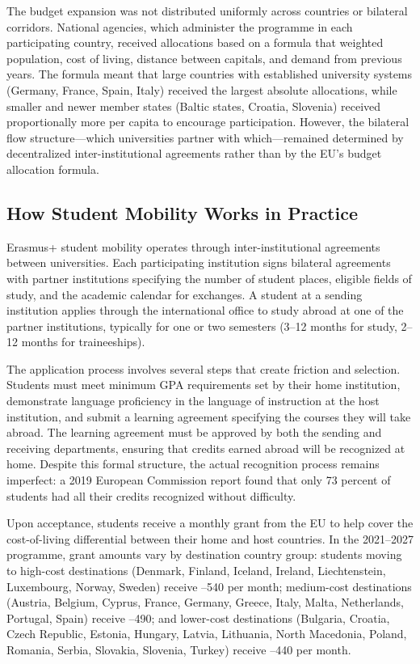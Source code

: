 \documentclass[12pt]{article}
\begin{document}
The budget expansion was not distributed uniformly across countries or bilateral corridors. National agencies, which administer the programme in each participating country, received allocations based on a formula that weighted population, cost of living, distance between capitals, and demand from previous years. The formula meant that large countries with established university systems (Germany, France, Spain, Italy) received the largest absolute allocations, while smaller and newer member states (Baltic states, Croatia, Slovenia) received proportionally more per capita to encourage participation. However, the bilateral flow structure---which universities partner with which---remained determined by decentralized inter-institutional agreements rather than by the EU's budget allocation formula.

\subsection{How Student Mobility Works in Practice}

Erasmus+ student mobility operates through inter-institutional agreements between universities. Each participating institution signs bilateral agreements with partner institutions specifying the number of student places, eligible fields of study, and the academic calendar for exchanges. A student at a sending institution applies through the international office to study abroad at one of the partner institutions, typically for one or two semesters (3--12 months for study, 2--12 months for traineeships).

The application process involves several steps that create friction and selection. Students must meet minimum GPA requirements set by their home institution, demonstrate language proficiency in the language of instruction at the host institution, and submit a learning agreement specifying the courses they will take abroad. The learning agreement must be approved by both the sending and receiving departments, ensuring that credits earned abroad will be recognized at home. Despite this formal structure, the actual recognition process remains imperfect: a 2019 European Commission report found that only 73 percent of students had all their credits recognized without difficulty.

Upon acceptance, students receive a monthly grant from the EU to help cover the cost-of-living differential between their home and host countries. In the 2021--2027 programme, grant amounts vary by destination country group: students moving to high-cost destinations (Denmark, Finland, Iceland, Ireland, Liechtenstein, Luxembourg, Norway, Sweden) receive --540 per month; medium-cost destinations (Austria, Belgium, Cyprus, France, Germany, Greece, Italy, Malta, Netherlands, Portugal, Spain) receive --490; and lower-cost destinations (Bulgaria, Croatia, Czech Republic, Estonia, Hungary, Latvia, Lithuania, North Macedonia, Poland, Romania, Serbia, Slovakia, Slovenia, Turkey) receive --440 per month.
\end{document}
